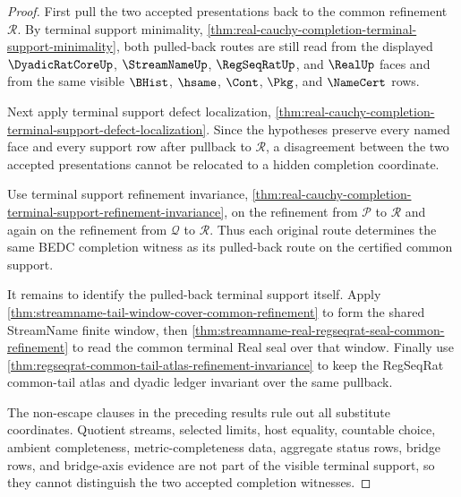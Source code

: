 \begin{proof}
First pull the two accepted presentations back to the common refinement $\mathcal R$. By terminal support minimality, \autoref{thm:real-cauchy-completion-terminal-support-minimality}, both pulled-back routes are still read from the displayed $\DyadicRatCoreUp$, $\StreamNameUp$, $\RegSeqRatUp$, and $\RealUp$ faces and from the same visible $\BHist$, $\hsame$, $\Cont$, $\Pkg$, and $\NameCert$ rows.

Next apply terminal support defect localization, \autoref{thm:real-cauchy-completion-terminal-support-defect-localization}. Since the hypotheses preserve every named face and every support row after pullback to $\mathcal R$, a disagreement between the two accepted presentations cannot be relocated to a hidden completion coordinate.

Use terminal support refinement invariance, \autoref{thm:real-cauchy-completion-terminal-support-refinement-invariance}, on the refinement from $\mathcal P$ to $\mathcal R$ and again on the refinement from $\mathcal Q$ to $\mathcal R$. Thus each original route determines the same BEDC completion witness as its pulled-back route on the certified common support.

It remains to identify the pulled-back terminal support itself. Apply \autoref{thm:streamname-tail-window-cover-common-refinement} to form the shared StreamName finite window, then \autoref{thm:streamname-real-regseqrat-seal-common-refinement} to read the common terminal Real seal over that window. Finally use \autoref{thm:regseqrat-common-tail-atlas-refinement-invariance} to keep the RegSeqRat common-tail atlas and dyadic ledger invariant over the same pullback.

The non-escape clauses in the preceding results rule out all substitute coordinates. Quotient streams, selected limits, host equality, countable choice, ambient completeness, metric-completeness data, aggregate status rows, bridge rows, and bridge-axis evidence are not part of the visible terminal support, so they cannot distinguish the two accepted completion witnesses.
\end{proof}

